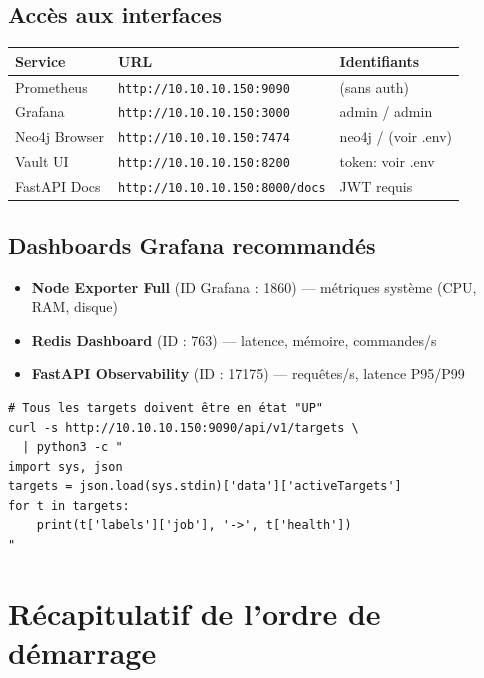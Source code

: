 \documentclass[12pt,a4paper,french]{article}
\begin{document}
\subsection{Accès aux interfaces}

\begin{tabularx}{\linewidth}{llX}
\toprule
\textbf{Service} & \textbf{URL} & \textbf{Identifiants} \\
\midrule
Prometheus & \texttt{http://10.10.10.150:9090} & (sans auth) \\
Grafana & \texttt{http://10.10.10.150:3000} & admin / admin \\
Neo4j Browser & \texttt{http://10.10.10.150:7474} & neo4j / (voir .env) \\
Vault UI & \texttt{http://10.10.10.150:8200} & token: voir .env \\
FastAPI Docs & \texttt{http://10.10.10.150:8000/docs} & JWT requis \\
\bottomrule
\end{tabularx}

\subsection{Dashboards Grafana recommandés}

\begin{itemize}
  \item \textbf{Node Exporter Full} (ID Grafana : 1860) — métriques système (CPU, RAM, disque)
  \item \textbf{Redis Dashboard} (ID : 763) — latence, mémoire, commandes/s
  \item \textbf{FastAPI Observability} (ID : 17175) — requêtes/s, latence P95/P99
\end{itemize}

\begin{lstlisting}[style=bash, caption={Vérifier que Prometheus scrape correctement}]
# Tous les targets doivent être en état "UP"
curl -s http://10.10.10.150:9090/api/v1/targets \
  | python3 -c "
import sys, json
targets = json.load(sys.stdin)['data']['activeTargets']
for t in targets:
    print(t['labels']['job'], '->', t['health'])
"
\end{lstlisting}

\section{Récapitulatif de l'ordre de démarrage}
\end{document}
